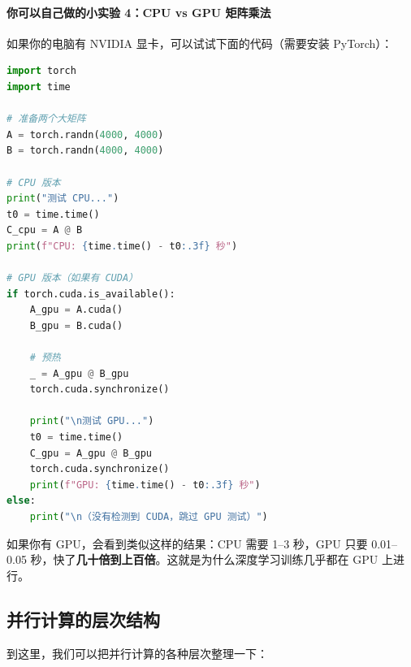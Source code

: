 \paragraph{你可以自己做的小实验 4：CPU vs GPU 矩阵乘法}

如果你的电脑有 NVIDIA 显卡，可以试试下面的代码（需要安装 PyTorch）：

\begin{lstlisting}[style=teaching, language=Python]
import torch
import time

# 准备两个大矩阵
A = torch.randn(4000, 4000)
B = torch.randn(4000, 4000)

# CPU 版本
print("测试 CPU...")
t0 = time.time()
C_cpu = A @ B
print(f"CPU: {time.time() - t0:.3f} 秒")

# GPU 版本（如果有 CUDA）
if torch.cuda.is_available():
    A_gpu = A.cuda()
    B_gpu = B.cuda()
    
    # 预热
    _ = A_gpu @ B_gpu
    torch.cuda.synchronize()
    
    print("\n测试 GPU...")
    t0 = time.time()
    C_gpu = A_gpu @ B_gpu
    torch.cuda.synchronize()
    print(f"GPU: {time.time() - t0:.3f} 秒")
else:
    print("\n（没有检测到 CUDA，跳过 GPU 测试）")
\end{lstlisting}

如果你有 GPU，会看到类似这样的结果：CPU 需要 1--3 秒，GPU 只要 0.01--0.05 秒，快了\textbf{几十倍到上百倍}。这就是为什么深度学习训练几乎都在 GPU 上进行。

\subsection*{并行计算的层次结构}

到这里，我们可以把并行计算的各种层次整理一下：

